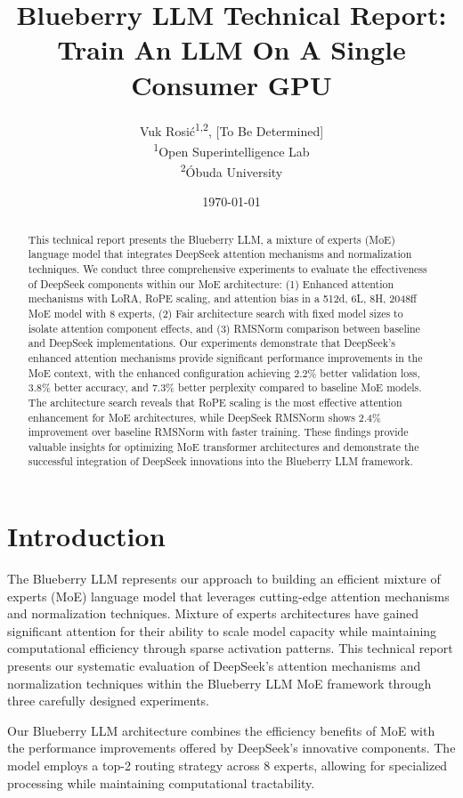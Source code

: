 \documentclass[11pt,a4paper]{article}
\title{Blueberry LLM Technical Report: Train An LLM On A Single Consumer GPU}
\author{
    Vuk Rosić\textsuperscript{1,2}, [To Be Determined] \\
    \textsuperscript{1}Open Superintelligence Lab \\
    \textsuperscript{2}Óbuda University
}
\date{\today}
\begin{document}
\maketitle

\begin{abstract}
This technical report presents the Blueberry LLM, a mixture of experts (MoE) language model that integrates DeepSeek attention mechanisms and normalization techniques. We conduct three comprehensive experiments to evaluate the effectiveness of DeepSeek components within our MoE architecture: (1) Enhanced attention mechanisms with LoRA, RoPE scaling, and attention bias in a 512d, 6L, 8H, 2048ff MoE model with 8 experts, (2) Fair architecture search with fixed model sizes to isolate attention component effects, and (3) RMSNorm comparison between baseline and DeepSeek implementations. Our experiments demonstrate that DeepSeek's enhanced attention mechanisms provide significant performance improvements in the MoE context, with the enhanced configuration achieving 2.2\% better validation loss, 3.8\% better accuracy, and 7.3\% better perplexity compared to baseline MoE models. The architecture search reveals that RoPE scaling is the most effective attention enhancement for MoE architectures, while DeepSeek RMSNorm shows 2.4\% improvement over baseline RMSNorm with faster training. These findings provide valuable insights for optimizing MoE transformer architectures and demonstrate the successful integration of DeepSeek innovations into the Blueberry LLM framework.
\end{abstract}

\section{Introduction}

The Blueberry LLM represents our approach to building an efficient mixture of experts (MoE) language model that leverages cutting-edge attention mechanisms and normalization techniques. Mixture of experts architectures have gained significant attention for their ability to scale model capacity while maintaining computational efficiency through sparse activation patterns. This technical report presents our systematic evaluation of DeepSeek's attention mechanisms and normalization techniques within the Blueberry LLM MoE framework through three carefully designed experiments.

Our Blueberry LLM architecture combines the efficiency benefits of MoE with the performance improvements offered by DeepSeek's innovative components. The model employs a top-2 routing strategy across 8 experts, allowing for specialized processing while maintaining computational tractability.
\end{document}
